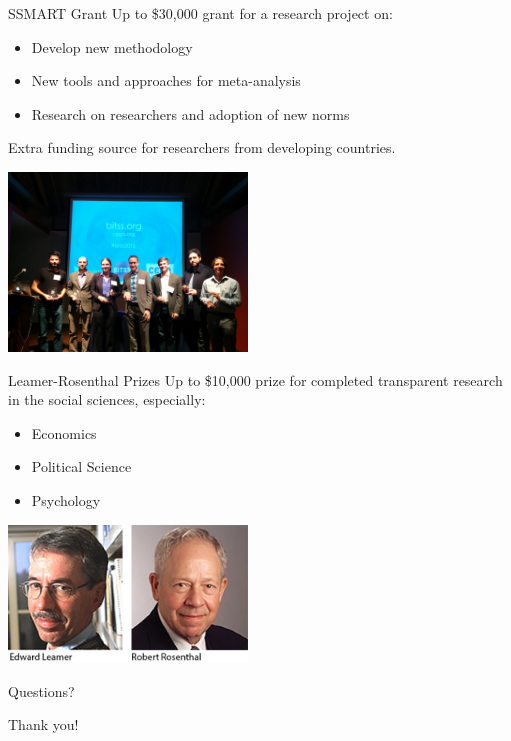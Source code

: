 \documentclass{beamer}
\begin{document}
\begin{frame}{SSMART Grant}
Up to \$30,000 grant for a research project on:
\begin{itemize}[<.->]
\item Develop new methodology
\item New tools and approaches for meta-analysis
\item Research on researchers and adoption of new norms
\end{itemize}
Extra funding source for researchers from developing countries.

\includegraphics[width=2.5in]{../Images/LRwinners.jpg}
\end{frame}

\begin{frame}{Leamer-Rosenthal Prizes}
Up to \$10,000 prize for completed transparent research in the social sciences,
especially:
\begin{itemize}[<.->]
\item Economics
\item Political Science
\item Psychology
\end{itemize}
\includegraphics[width=2.5in]{../Images/leamer1-zoomed33.jpg}
\end{frame}


\begin{frame}
\begin{center}
Questions?
\vspace{1in}


\Huge{Thank you!}
\end{center}
\end{frame}
\end{document}
